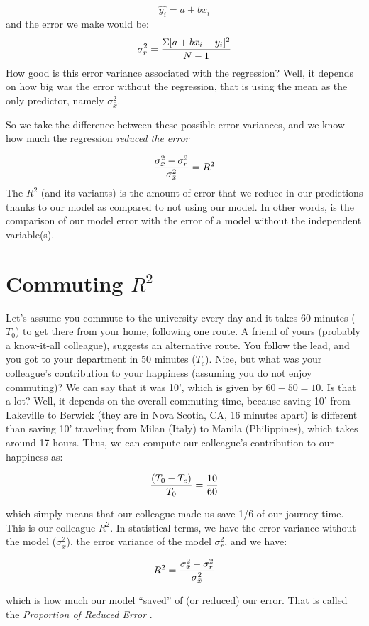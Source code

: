 \documentclass[
]{book}
\begin{document}
\[ \hat{y_i}=a+bx_i\]
and the error we make would be:
\[ \sigma^2_r={\Sigma{[a+bx_i-y_i]^2} \over {N-1}}\]
How good is this error variance associated with the regression? Well, it depends on how big was the error without the regression, that is using the mean as the only predictor, namely \(\sigma^2_{\bar{x}}\).

So we take the difference between these possible error variances, and we know how much the regression \emph{reduced the error}

\[ {\sigma^2_{\bar{x}}-\sigma^2_r \over \sigma^2_{\bar{x}}}=R^2\]
The \(R^2\) (and its variants) is the amount of error that we reduce in our predictions thanks to our model as compared to not using our model. In other words, is the comparison of our model error with the error of a model without the independent variable(s).

\hypertarget{commuting-r2}{%
\section{\texorpdfstring{Commuting \(R^2\)}{Commuting R\^{}2}}\label{commuting-r2}}

Let's assume you commute to the university every day and it takes 60 minutes (\(T_0\)) to get there from your home, following one route. A friend of yours (probably a know-it-all colleague), suggests an alternative route. You follow the lead, and you got to your department in 50 minutes (\(T_c\)). Nice, but what was your colleague's contribution to your happiness (assuming you do not enjoy commuting)? We can say that it was 10', which is given by \(60-50=10\). Is that a lot? Well, it depends on the overall commuting time, because saving 10' from Lakeville to Berwick (they are in Nova Scotia, CA, 16 minutes apart) is different than saving 10' traveling from Milan (Italy) to Manila (Philippines), which takes around 17 hours. Thus, we can compute our colleague's contribution to our happiness as:

\[ {(T_0-T_c) \over T_0}={10 \over60}\]

which simply means that our colleague made us save 1/6 of our journey time. This is our colleague \(R^2\). In statistical terms, we have the error variance without the model (\(\sigma_{\bar{x}}^2\)), the error variance of the model \(\sigma_{r}^2\), and we have:

\[ R^2={\sigma^2_{\bar{x}}-\sigma^2_r \over \sigma^2_{\bar{x}}}\]

which is how much our model ``saved'' of (or reduced) our error. That is called the \emph{Proportion of Reduced Error} \citep{judd2017data}.
\end{document}
